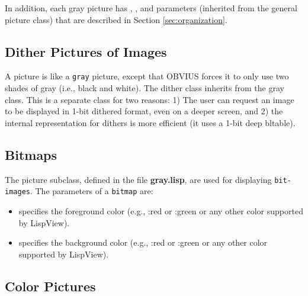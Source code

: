 In addition, each gray picture has , , and
 parameters (inherited from the general picture class)
that are described in Section \ref{sec:organization}.  


\subsection{Dither Pictures of Images}
\label{sec:dither}

A  picture is like a {\tt gray} picture, except that
OBVIUS forces it to only use two shades of gray (i.e., black and
white).  The dither class inherits from the gray class.  This is a
separate class for two reasons: 1) The user can request an image to be
displayed in 1-bit dithered format, even on a deeper screen, and 2)
the internal representation for dithers is more efficient (it uses a
1-bit deep bltable).


\subsection{Bitmaps}
\label{sec:bitmap}

The  picture subclass, defined in the file {\bf
gray.lisp}, are used for displaying {\tt bit-images}.  The parameters
of a {\tt bitmap} are:
\begin{itemize}
\item {} specifies the foreground color (e.g., :red or
:green or any other color supported by LispView).
\item {} specifies the background color (e.g., :red or
:green or any other color supported by LispView).
\end{itemize}


\subsection{Color Pictures}
\label{sec:color-picture}

